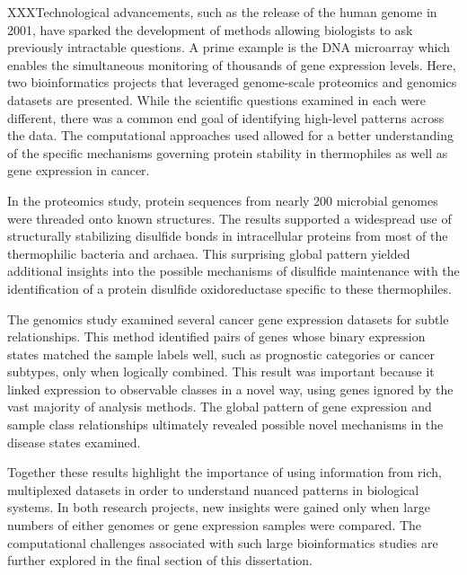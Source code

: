 XXXTechnological advancements, such as the release of the human genome in 2001,
have sparked the development of methods allowing biologists to ask previously
intractable questions.  A prime example is the DNA microarray which enables the
simultaneous monitoring of thousands of gene expression levels.  Here, two
bioinformatics projects that leveraged genome-scale proteomics and genomics
datasets are presented. While the scientific questions examined in each were
different, there was a common end goal of identifying high-level patterns
across the data. The computational approaches used allowed for a better
understanding of the specific mechanisms governing protein stability in
thermophiles as well as gene expression in cancer.

In the proteomics study, protein sequences from nearly 200 microbial genomes
were threaded onto known structures. The results supported a widespread use of
structurally stabilizing disulfide bonds in intracellular proteins from most of
the thermophilic bacteria and archaea.  This surprising global pattern yielded
additional insights into the possible mechanisms of disulfide maintenance with
the identification of a protein disulfide oxidoreductase specific to these
thermophiles.

The genomics study examined several cancer gene expression datasets for subtle
relationships.  This method identified pairs of genes whose binary expression
states matched the sample labels well, such as prognostic categories or cancer
subtypes, only when logically combined.  This result was important because
it linked expression to observable classes in a novel way, using genes
ignored by the vast majority of analysis methods.  The global pattern of gene
expression and sample class relationships ultimately revealed possible novel
mechanisms in the disease states examined.

Together these results highlight the importance of using information from rich,
multiplexed datasets in order to understand nuanced patterns in biological
systems.  In both research projects, new insights were gained only when large
numbers of either genomes or gene expression samples were compared.  The
computational challenges associated with such large bioinformatics studies are
further explored in the final section of this dissertation.
